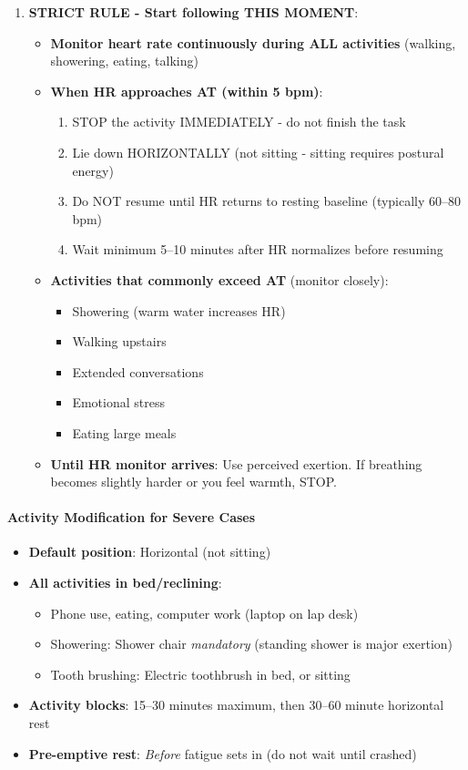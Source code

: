 \begin{enumerate}
    \item \textbf{STRICT RULE - Start following THIS MOMENT}:
    \begin{itemize}
        \item \textbf{Monitor heart rate continuously during ALL activities} (walking, showering, eating, talking)
        \item \textbf{When HR approaches AT (within 5 bpm)}:
        \begin{enumerate}
            \item STOP the activity IMMEDIATELY - do not finish the task
            \item Lie down HORIZONTALLY (not sitting - sitting requires postural energy)
            \item Do NOT resume until HR returns to resting baseline (typically 60--80 bpm)
            \item Wait minimum 5--10 minutes after HR normalizes before resuming
        \end{enumerate}
        \item \textbf{Activities that commonly exceed AT} (monitor closely):
        \begin{itemize}
            \item Showering (warm water increases HR)
            \item Walking upstairs
            \item Extended conversations
            \item Emotional stress
            \item Eating large meals
        \end{itemize}
        \item \textbf{Until HR monitor arrives}: Use perceived exertion. If breathing becomes slightly harder or you feel warmth, STOP.
    \end{itemize}
\end{enumerate}

\paragraph{Activity Modification for Severe Cases}

\begin{itemize}
    \item \textbf{Default position}: Horizontal (not sitting)
    \item \textbf{All activities in bed/reclining}:
    \begin{itemize}
        \item Phone use, eating, computer work (laptop on lap desk)
        \item Showering: Shower chair \emph{mandatory} (standing shower is major exertion)
        \item Tooth brushing: Electric toothbrush in bed, or sitting
    \end{itemize}
    \item \textbf{Activity blocks}: 15--30 minutes maximum, then 30--60 minute horizontal rest
    \item \textbf{Pre-emptive rest}: \emph{Before} fatigue sets in (do not wait until crashed)
\end{itemize}

